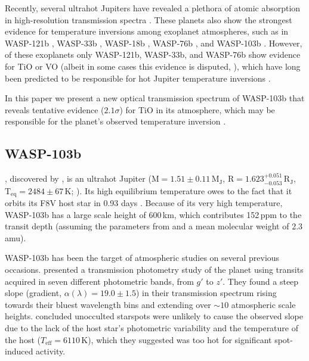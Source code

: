 \documentclass[twocolumn]{aastex63}
\newcommand{\Rjup}{{$\mathrm{R_{J}}$}}
\newcommand{\Mjup}{{$\mathrm{M_{J}}$}}
\begin{document}
Recently, several ultrahot Jupiters have revealed a plethora of atomic absorption in high-resolution transmission spectra \citep[e.g.,][]{Hoeijmakers2018,Hoeijmakers2019,Hoeijmakers2020,Sing2019,Yan2019,Cabot2020,Ehrenreich2020,Gibson2020,Nugroho2020,Borsa2021,Yan2021}. These planets also show the strongest evidence for temperature inversions among exoplanet atmospheres, such as in WASP-121b \citep{Evans2017,Evans2020}, WASP-33b \citep{Haynes2015,Nugroho2017}, WASP-18b \citep{Sheppard2017,Arcangeli2018}, WASP-76b \citep{Fu2020}, and WASP-103b \citep{Kreidberg2018}. However, of these exoplanets only WASP-121b, WASP-33b, and WASP-76b show evidence for TiO or VO (albeit in some cases this evidence is disputed, \citealp[e.g.,][]{Merritt2020,Borsa2021}), which have long been predicted to be responsible for hot Jupiter temperature inversions \citep[e.g.,][]{Hubeny2003,Fortney2008,Spiegel2009}. 

In this paper we present a new optical transmission spectrum of WASP-103b that reveals tentative evidence ($2.1\sigma$) for TiO in its atmosphere, which may be responsible for the planet's observed temperature inversion \citep{Kreidberg2018}.


\subsection{WASP-103b}

, discovered by \cite{Gillon2014}, is an ultrahot Jupiter ($\mathrm{M} = 1.51 \pm 0.11$\,\Mjup, $\mathrm{R} = 1.623^{+0.051}_{-0.053}$\,\Rjup, $\mathrm{T_{eq}} = 2484 \pm 67$\,K; \citealt{Delrez2018}). Its high equilibrium temperature owes to the fact that it orbits its F8V host star in 0.93 days \citep{Gillon2014,Delrez2018}. Because of its very high temperature, WASP-103b has a large scale height of 600\,km, which contributes 152\,ppm to the transit depth (assuming the parameters from \citealt{Delrez2018} and a mean molecular weight of 2.3\,amu). 

WASP-103b has been the target of atmospheric studies on several previous occasions. \cite{Southworth2015} presented a transmission photometry study of the planet using transits acquired in seven different photometric bands, from $g'$ to $z'$. They found a steep slope (gradient, $\alpha(\lambda) = 19.0 \pm 1.5$) in their transmission spectrum rising towards their bluest wavelength bins and extending over ${\sim}10$ atmospheric scale heights. \cite{Southworth2015} concluded unocculted starspots were unlikely to cause the observed slope due to the lack of the host star's photometric variability \citep{Gillon2014} and the temperature of the host ($T_{\mathrm{eff}} = 6110$\,K), which they suggested was too hot for significant spot-induced activity.
\end{document}
